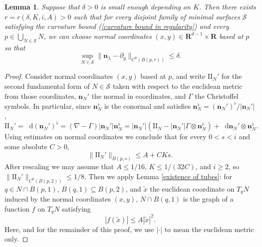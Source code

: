 \documentclass[reqno,11pt]{amsart}
\newcommand{\RR}{\mathbf{R}}
\newcommand*\dif{\mathop{}\!\mathrm{d}}
\newcommand{\Two}{\mathrm{I\!I}}
\newcommand{\normal}{\mathbf n}
\newtheorem{lemma}[theorem]{Lemma}
\theoremstyle{definition}
\numberwithin{equation}{section}
\begin{document}
\begin{lemma}\label{lams have C0 fields}
	Suppose that $\delta > 0$ is small enough depending on $K$.
	Then there exists $r = r(\delta, K, i, A) > 0$ such that for every disjoint family of minimal surfaces $\mathcal S$ satisfying the curvature bound (\ref{curvature bound in regularity}) and every $p \in \bigcup_{N \in \mathcal S} N$, we can choose normal coordinates $(x, y) \in \RR^{d - 1} \times \RR$ based at $p$ so that
\begin{equation}\label{normal is basically dy}
	\sup_{N \in \mathcal S} \|\normal_\lambda - \partial_y\|_{C^0(B(p, r))} \leq \delta.
\end{equation}
\end{lemma}
\begin{proof}
Consider normal coordinates $(x, y)$ based at $p$, and write $\Two_N'$ for the second fundamental form of $N \in \mathcal S$ taken with respect to the euclidean metric from those coordinates, $\normal_N'$ the normal in coordinates, and $\Gamma$ the Christoffel symbols.
In particular, since $\normal_N^\flat$ is the conormal and satisfies $\normal_N^\flat = (\normal_N')^\flat/|\normal_N'|$, 
$$\Two_N' = \dif (\normal_N')^\flat = (\nabla - \Gamma) |\normal_N'| \normal_N^\flat = |\normal_N'| (\Two_N - |\normal_N'| \Gamma \otimes \normal_N^\flat) + \dif \normal_N' \otimes \normal_N^\flat.$$
Using estimates on normal coordinates we conclude that for every $0 < s < i$ and some absolute $C > 0$,
$$\|\Two_N'\|_{B(p, s)} \leq A + CKs.$$
After rescaling we may assume that $A \leq 1/16$, $K \leq 1/(32C)$, and $i \geq 2$, so $\|\Two_N'\|_{C^0(B(p, 2))} \leq 1/8$.
Then we apply Lemma \ref{existence of tubes}: for $q \in N \cap B(p, 1)$, $B(q, 1) \subseteq B(p, 2)$, and $\tilde x$ the euclidean coordinate on $T_q N$ induced by the normal coordinates $(x, y)$, $N \cap B(q, 1)$ is the graph of a function $f$ on $T_q N$ satisfying
\begin{equation}\label{living in a tube}
|f(\tilde x)| \leq A|\tilde x|^2.
\end{equation}
Here, and for the remainder of this proof, we use $|\cdot|$ to mean the euclidean metric only.


\end{proof}
\end{document}
